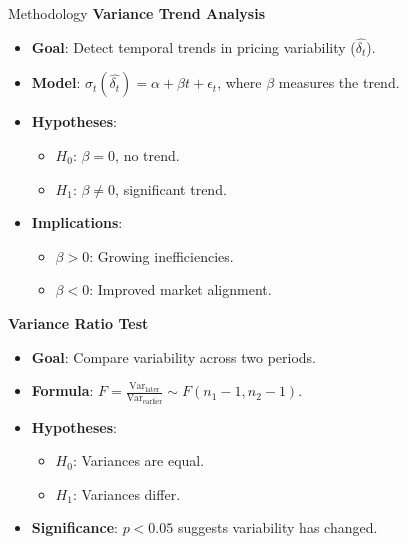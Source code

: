 \documentclass[aspectratio=169,xcolor=dvipsnames]{beamer}
\begin{document}
\begin{frame}{Methodology}
\textbf{Variance Trend Analysis}
\begin{itemize}
    \item \textbf{Goal}: Detect temporal trends in pricing variability (\(\hat{\delta_t}\)).
    \item \textbf{Model}: \(\sigma_t(\hat{\delta_t}) = \alpha + \beta t + \epsilon_t\), where \(\beta\) measures the trend.
    \item \textbf{Hypotheses}:
    \begin{itemize}
        \item \(H_0\): \(\beta = 0\), no trend.
        \item \(H_1\): \(\beta \neq 0\), significant trend.
    \end{itemize}
    \item \textbf{Implications}:
    \begin{itemize}
        \item \(\beta > 0\): Growing inefficiencies.
        \item \(\beta < 0\): Improved market alignment.
    \end{itemize}
\end{itemize}

\vspace{0.3cm}

\textbf{Variance Ratio Test}
\begin{itemize}
    \item \textbf{Goal}: Compare variability across two periods.
    \item \textbf{Formula}: \(F = \frac{\text{Var}_{\text{later}}}{\text{Var}_{\text{earlier}}} \sim F(n_1 - 1, n_2 - 1)\).
    \item \textbf{Hypotheses}:
    \begin{itemize}
        \item \(H_0\): Variances are equal.
        \item \(H_1\): Variances differ.
    \end{itemize}
    \item \textbf{Significance}: \(p < 0.05\) suggests variability has changed.
\end{itemize}    
\end{frame}


\end{document}
